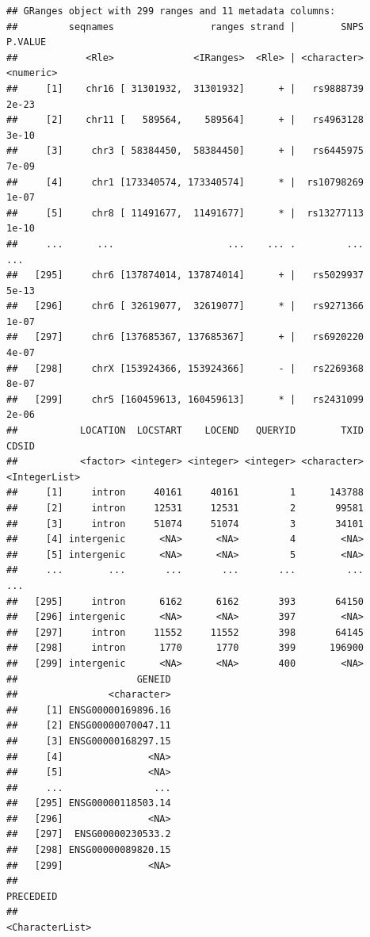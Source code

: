 \documentclass[9pt,a4paper,]{extarticle}
\begin{document}
\begin{verbatim}
## GRanges object with 299 ranges and 11 metadata columns:
##         seqnames                 ranges strand |        SNPS   P.VALUE
##            <Rle>              <IRanges>  <Rle> | <character> <numeric>
##     [1]    chr16 [ 31301932,  31301932]      + |   rs9888739     2e-23
##     [2]    chr11 [   589564,    589564]      + |   rs4963128     3e-10
##     [3]     chr3 [ 58384450,  58384450]      + |   rs6445975     7e-09
##     [4]     chr1 [173340574, 173340574]      * |  rs10798269     1e-07
##     [5]     chr8 [ 11491677,  11491677]      * |  rs13277113     1e-10
##     ...      ...                    ...    ... .         ...       ...
##   [295]     chr6 [137874014, 137874014]      + |   rs5029937     5e-13
##   [296]     chr6 [ 32619077,  32619077]      * |   rs9271366     1e-07
##   [297]     chr6 [137685367, 137685367]      + |   rs6920220     4e-07
##   [298]     chrX [153924366, 153924366]      - |   rs2269368     8e-07
##   [299]     chr5 [160459613, 160459613]      * |   rs2431099     2e-06
##           LOCATION  LOCSTART    LOCEND   QUERYID        TXID         CDSID
##           <factor> <integer> <integer> <integer> <character> <IntegerList>
##     [1]     intron     40161     40161         1      143788              
##     [2]     intron     12531     12531         2       99581              
##     [3]     intron     51074     51074         3       34101              
##     [4] intergenic      <NA>      <NA>         4        <NA>              
##     [5] intergenic      <NA>      <NA>         5        <NA>              
##     ...        ...       ...       ...       ...         ...           ...
##   [295]     intron      6162      6162       393       64150              
##   [296] intergenic      <NA>      <NA>       397        <NA>              
##   [297]     intron     11552     11552       398       64145              
##   [298]     intron      1770      1770       399      196900              
##   [299] intergenic      <NA>      <NA>       400        <NA>              
##                     GENEID
##                <character>
##     [1] ENSG00000169896.16
##     [2] ENSG00000070047.11
##     [3] ENSG00000168297.15
##     [4]               <NA>
##     [5]               <NA>
##     ...                ...
##   [295] ENSG00000118503.14
##   [296]               <NA>
##   [297]  ENSG00000230533.2
##   [298] ENSG00000089820.15
##   [299]               <NA>
##                                                            PRECEDEID
##                                                      <CharacterList>

\end{verbatim}
\end{document}
